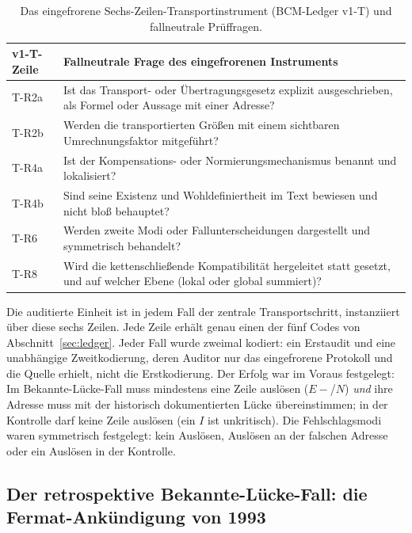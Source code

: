 \documentclass[11pt,a4paper]{article}
\begin{document}
\clearpage
\begin{table}[htbp]
\centering
\small
\caption{Das eingefrorene Sechs-Zeilen-Transportinstrument (BCM-Ledger v1-T) und fallneutrale Prüffragen.}
\label{tab:frozen_instrument_v1t}
\begin{tabularx}{\textwidth}{@{}l >{\raggedright\arraybackslash}X@{}}
\toprule
v1-T-Zeile & Fallneutrale Frage des eingefrorenen Instruments \\
\midrule
T-R2a & Ist das Transport- oder Übertragungsgesetz explizit ausgeschrieben,
        als Formel oder Aussage mit einer Adresse? \\
\addlinespace[3pt]
T-R2b & Werden die transportierten Größen mit einem sichtbaren
        Umrechnungsfaktor mitgeführt? \\
\addlinespace[3pt]
T-R4a & Ist der Kompensations- oder Normierungsmechanismus benannt und
        lokalisiert? \\
\addlinespace[3pt]
T-R4b & Sind seine Existenz und Wohldefiniertheit im Text bewiesen und nicht
        bloß behauptet? \\
\addlinespace[3pt]
T-R6 & Werden zweite Modi oder Fallunterscheidungen dargestellt und
       symmetrisch behandelt? \\
\addlinespace[3pt]
T-R8 & Wird die kettenschließende Kompatibilität hergeleitet statt gesetzt,
       und auf welcher Ebene (lokal oder global summiert)? \\
\bottomrule
\end{tabularx}
\end{table}

Die auditierte Einheit ist in jedem Fall der zentrale Transportschritt,
instanziiert über diese sechs Zeilen. Jede Zeile erhält genau einen der fünf
Codes von Abschnitt~\ref{sec:ledger}. Jeder Fall wurde zweimal kodiert: ein
Erstaudit und eine unabhängige Zweitkodierung, deren Auditor nur das
eingefrorene Protokoll und die Quelle erhielt, nicht die Erstkodierung. Der
Erfolg war im Voraus festgelegt: Im Bekannte-Lücke-Fall muss mindestens eine
Zeile auslösen ($E{-}$/$N$) \emph{und} ihre Adresse muss mit der historisch
dokumentierten Lücke übereinstimmen; in der Kontrolle darf keine Zeile
auslösen (ein $I$ ist unkritisch). Die Fehlschlagsmodi waren symmetrisch
festgelegt: kein Auslösen, Auslösen an der falschen Adresse oder ein Auslösen
in der Kontrolle.

\subsection[Der retrospektive Bekannte-Lücke-Fall:\texorpdfstring{\newline}{ }die Fermat-Ankündigung von 1993]{Der re\-tro\-spek\-ti\-ve Be\-kann\-te-Lü\-cke-Fall: die Fer\-mat-An\-kün\-di\-gung von 1993}
\end{document}
